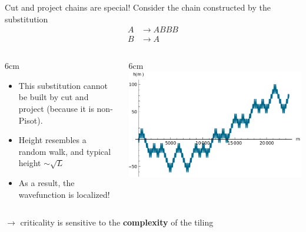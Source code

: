 \documentclass[xcolor=x11names,compress,professionalfonts, aspectratio=169]{beamer}
\renewcommand{\(}{\begin{columns}}
\renewcommand{\)}{\end{columns}}
\newcommand{\<}[1]{\begin{column}{#1}}
\renewcommand{\>}{\end{column}}
\begin{document}
\begin{frame}{Cut and project chains are special!}
Consider the chain constructed by the substitution
\begin{align*}
	A & \to ABBB \\
	B & \to A
\end{align*}
\begin{columns}
\<{6cm}
\begin{itemize}
	\item This substitution cannot be built by cut and project (because it is non-Pisot).
	\item Height resembles a random walk, and typical height $\sim \sqrt{L}$
	\item As a result, the wavefunction is localized! 
\end{itemize}
\>
\<{6cm}
\includegraphics[scale=.5]{img/heightsB3.pdf}
\>
\end{columns}
$\rightarrow$ criticality is sensitive to the \textbf{complexity} of the tiling
\end{frame}
\end{document}
